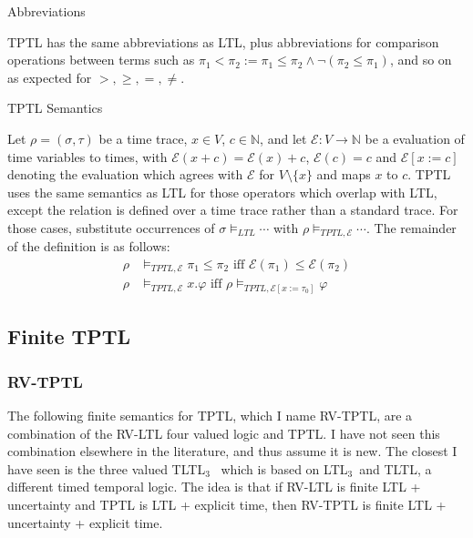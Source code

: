 \documentclass[a4paper]{article}
\newcommand{\tiff}{\text{ iff }}
\newcommand{\eval}{\mathcal{E}}
\newcommand{\ltlt}{LTL$_3$}
\begin{document}
\begin{notn}{Abbreviations}\label{tptlabbrev}

  TPTL has the same abbreviations as LTL, plus abbreviations for comparison operations between terms such as $\pi_1 < \pi_2 := \pi_1 \leq \pi_2 \land \neg(\pi_2 \leq \pi_1)$, and so on as expected for $>,\geq,=,\neq$.
\end{notn}

\begin{defn}{TPTL Semantics}

  Let $\rho = (\sigma,\tau)$ be a time trace, $x\in V$, $c\in\mathbb{N}$, and let $\eval:V\to\mathbb{N}$ be a evaluation of time variables to times, with $\eval(x + c) = \eval(x) + c$, $\eval(c) = c$ and $\eval[x:=c]$ denoting the evaluation which agrees with $\eval$ for $V\setminus\{x\}$ and maps $x$ to $c$.
  TPTL uses the same semantics as LTL for those operators which overlap with LTL, except the relation is defined over a time trace rather than a standard trace. For those cases, substitute occurrences of $\sigma\vDash_{LTL}\cdots$ with $\rho\vDash_{TPTL,\eval}\cdots$. The remainder of the definition is as follows:
  \begin{align*}
    \rho&\vDash_{TPTL,\eval}\pi_1\leq\pi_2 \tiff \eval(\pi_1)\leq\eval(\pi_2)\\
    \rho&\vDash_{TPTL,\eval} x.\varphi \tiff \rho\vDash_{TPTL,\eval[x:=\tau_0]}\varphi
  \end{align*}
\end{defn}

\subsection{Finite TPTL}
\subsubsection{RV-TPTL} The following finite semantics for TPTL, which I name RV-TPTL, are a combination of the RV-LTL four valued logic and TPTL. I have not seen this combination elsewhere in the literature, and thus assume it is new. The closest I have seen is the three valued TLTL$_3$~\autocite[6]{arafat2005runtime} which is based on \ltlt\ and TLTL, a different timed temporal logic. The idea is that if RV-LTL is finite LTL + uncertainty and TPTL is LTL + explicit time, then RV-TPTL is finite LTL + uncertainty + explicit time.
\end{document}
